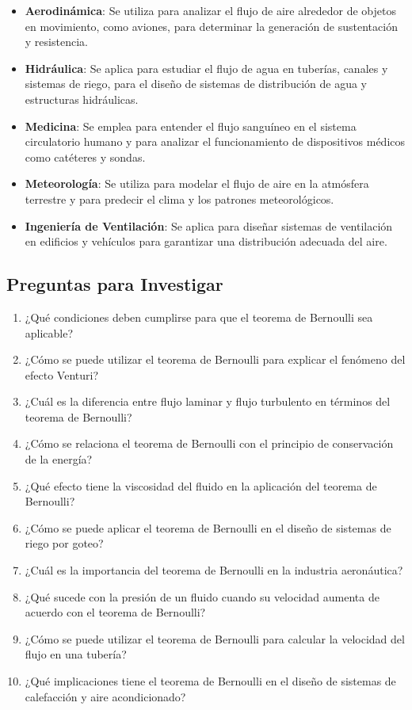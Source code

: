 \documentclass[../main]{subfiles}
\begin{document}
\begin{itemize}
    \item \textbf{Aerodinámica}: Se utiliza para analizar el flujo de aire alrededor de objetos en movimiento, como aviones, para determinar la generación de sustentación y resistencia.
    \item \textbf{Hidráulica}: Se aplica para estudiar el flujo de agua en tuberías, canales y sistemas de riego, para el diseño de sistemas de distribución de agua y estructuras hidráulicas.
    \item \textbf{Medicina}: Se emplea para entender el flujo sanguíneo en el sistema circulatorio humano y para analizar el funcionamiento de dispositivos médicos como catéteres y sondas.
    \item \textbf{Meteorología}: Se utiliza para modelar el flujo de aire en la atmósfera terrestre y para predecir el clima y los patrones meteorológicos.
    \item \textbf{Ingeniería de Ventilación}: Se aplica para diseñar sistemas de ventilación en edificios y vehículos para garantizar una distribución adecuada del aire.
\end{itemize}

\subsection{Preguntas para Investigar}

\begin{enumerate}
    \item ¿Qué condiciones deben cumplirse para que el teorema de Bernoulli sea aplicable?
    \item ¿Cómo se puede utilizar el teorema de Bernoulli para explicar el fenómeno del efecto Venturi?
    \item ¿Cuál es la diferencia entre flujo laminar y flujo turbulento en términos del teorema de Bernoulli?
    \item ¿Cómo se relaciona el teorema de Bernoulli con el principio de conservación de la energía?
    \item ¿Qué efecto tiene la viscosidad del fluido en la aplicación del teorema de Bernoulli?
    \item ¿Cómo se puede aplicar el teorema de Bernoulli en el diseño de sistemas de riego por goteo?
    \item ¿Cuál es la importancia del teorema de Bernoulli en la industria aeronáutica?
    \item ¿Qué sucede con la presión de un fluido cuando su velocidad aumenta de acuerdo con el teorema de Bernoulli?
    \item ¿Cómo se puede utilizar el teorema de Bernoulli para calcular la velocidad del flujo en una tubería?
    \item ¿Qué implicaciones tiene el teorema de Bernoulli en el diseño de sistemas de calefacción y aire acondicionado?
\end{enumerate}
\end{document}
